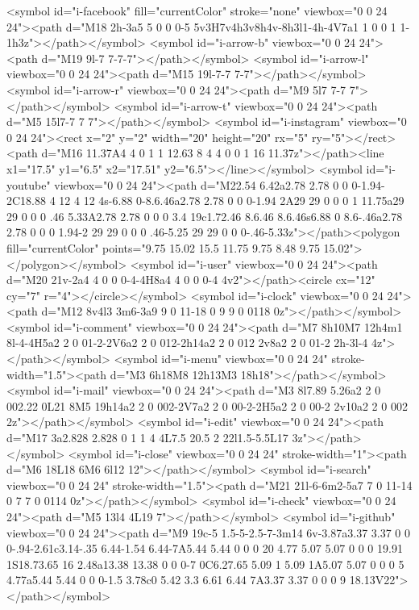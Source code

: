 {{{{<symbol id="i-facebook" fill="currentColor" stroke="none" viewbox="0 0 24 24"><path d="M18 2h-3a5 5 0 0 0-5 5v3H7v4h3v8h4v-8h3l1-4h-4V7a1 1 0 0 1 1-1h3z"></path></symbol>
<symbol id="i-arrow-b" viewbox="0 0 24 24"><path d="M19 9l-7 7-7-7"></path></symbol>
<symbol id="i-arrow-l" viewbox="0 0 24 24"><path d="M15 19l-7-7 7-7"></path></symbol>
<symbol id="i-arrow-r" viewbox="0 0 24 24"><path d="M9 5l7 7-7 7"></path></symbol>
<symbol id="i-arrow-t" viewbox="0 0 24 24"><path d="M5 15l7-7 7 7"></path></symbol>
<symbol id="i-instagram" viewbox="0 0 24 24"><rect x="2" y="2" width="20" height="20" rx="5" ry="5"></rect><path d="M16 11.37A4 4 0 1 1 12.63 8 4 4 0 0 1 16 11.37z"></path><line x1="17.5" y1="6.5" x2="17.51" y2="6.5"></line></symbol>
<symbol id="i-youtube" viewbox="0 0 24 24"><path d="M22.54 6.42a2.78 2.78 0 0 0-1.94-2C18.88 4 12 4 12 4s-6.88 0-8.6.46a2.78 2.78 0 0 0-1.94 2A29 29 0 0 0 1 11.75a29 29 0 0 0 .46 5.33A2.78 2.78 0 0 0 3.4 19c1.72.46 8.6.46 8.6.46s6.88 0 8.6-.46a2.78 2.78 0 0 0 1.94-2 29 29 0 0 0 .46-5.25 29 29 0 0 0-.46-5.33z"></path><polygon fill="currentColor" points="9.75 15.02 15.5 11.75 9.75 8.48 9.75 15.02"></polygon></symbol>
<symbol id="i-user" viewbox="0 0 24 24"><path d="M20 21v-2a4 4 0 0 0-4-4H8a4 4 0 0 0-4 4v2"></path><circle cx="12" cy="7" r="4"></circle></symbol>
<symbol id="i-clock" viewbox="0 0 24 24"><path d="M12 8v4l3 3m6-3a9 9 0 11-18 0 9 9 0 0118 0z"></path></symbol>
<symbol id="i-comment" viewbox="0 0 24 24"><path d="M7 8h10M7 12h4m1 8l-4-4H5a2 2 0 01-2-2V6a2 2 0 012-2h14a2 2 0 012 2v8a2 2 0 01-2 2h-3l-4 4z"></path></symbol>
<symbol id="i-menu" viewbox="0 0 24 24" stroke-width="1.5"><path d="M3 6h18M8 12h13M3 18h18"></path></symbol>
<symbol id="i-mail" viewbox="0 0 24 24"><path d="M3 8l7.89 5.26a2 2 0 002.22 0L21 8M5 19h14a2 2 0 002-2V7a2 2 0 00-2-2H5a2 2 0 00-2 2v10a2 2 0 002 2z"></path></symbol>
<symbol id="i-edit" viewbox="0 0 24 24"><path d="M17 3a2.828 2.828 0 1 1 4 4L7.5 20.5 2 22l1.5-5.5L17 3z"></path></symbol>
<symbol id="i-close" viewbox="0 0 24 24" stroke-width="1"><path d="M6 18L18 6M6 6l12 12"></path></symbol>
<symbol id="i-search" viewbox="0 0 24 24" stroke-width="1.5"><path d="M21 21l-6-6m2-5a7 7 0 11-14 0 7 7 0 0114 0z"></path></symbol>
<symbol id="i-check" viewbox="0 0 24 24"><path d="M5 13l4 4L19 7"></path></symbol>
<symbol id="i-github" viewbox="0 0 24 24"><path d="M9 19c-5 1.5-5-2.5-7-3m14 6v-3.87a3.37 3.37 0 0 0-.94-2.61c3.14-.35 6.44-1.54 6.44-7A5.44 5.44 0 0 0 20 4.77 5.07 5.07 0 0 0 19.91 1S18.73.65 16 2.48a13.38 13.38 0 0 0-7 0C6.27.65 5.09 1 5.09 1A5.07 5.07 0 0 0 5 4.77a5.44 5.44 0 0 0-1.5 3.78c0 5.42 3.3 6.61 6.44 7A3.37 3.37 0 0 0 9 18.13V22"></path></symbol>
}}}}
